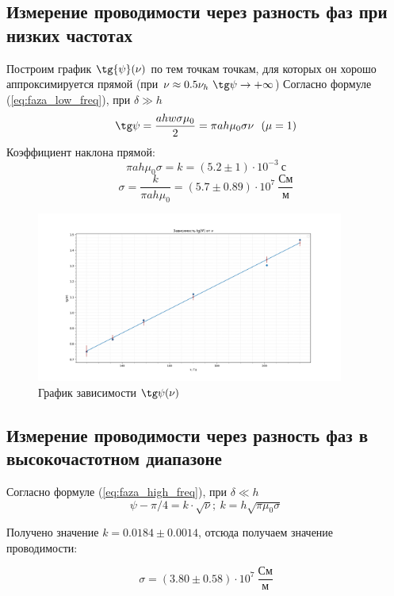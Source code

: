 \documentclass[a4paper, 12pt]{article}
\begin{document}
	\subsection*{Измерение проводимости через разность фаз при низких частотах}
	Построим график $\tg{\psi} (\nu)$ по тем точкам точкам, для которых он хорошо аппроксимируется прямой (при $\nu \approx 0.5 \nu_h \ \tg \psi \rightarrow +\infty$) 
	Согласно формуле (\ref{eq:faza_low_freq}), при $\delta \gg h$
	\begin{equation*}
		\tg \psi = \frac{ahw \sigma \mu_0}{2} = \pi ah\mu_0\sigma \nu \ \ (\mu = 1)
	\end{equation*}
	Коэффициент наклона прямой: \[\pi ah \mu_0\sigma = k = (5.2 \pm 1) \cdot 10^{-3} \ \text{с}\]
	\[\sigma = \frac{k}{\pi ah \mu_0} = (5.7 \pm 0.89) \cdot 10^7 \ \frac{\text{См}}{\text{м}}\]
	\begin{figure}[H]
		\centering
		\includegraphics[width=0.9\textwidth, height = 0.45\textheight]{Figure_1.png}
		\caption{График зависимости $\tg \psi (\nu)$}\label{Figure_1.png}
	\end{figure}

	\subsection*{Измерение проводимости через разность фаз в высокочастотном диапазоне}
	Согласно формуле (\ref{eq:faza_high_freq}), при $\delta \ll h$
	\begin{equation*}
		\psi - \pi/4 = k\cdot \sqrt{\nu}; \ k = h\sqrt{\pi\mu_0\sigma}
	\end{equation*}
	
	Получено значение $k = 0.0184 \pm 0.0014$, отсюда получаем значение проводимости:
	
	\begin{equation}
		\sigma = (3.80 \pm 0.58) \cdot 10^7 \ \frac{\text{См}}{\text{м}}
	\end{equation}
	
\end{document}
